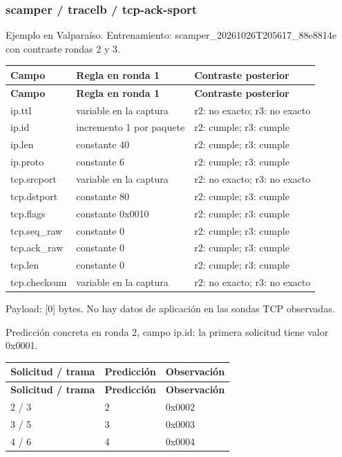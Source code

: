 \subsubsection{scamper / tracelb / tcp-ack-sport}
Ejemplo en Valparaíso. Entrenamiento: scamper\_\allowbreak{}20261026T205617\_\allowbreak{}88e8814e con contraste rondas 2 y 3.

\begingroup
\fontsize{9}{11}\selectfont
\addtocounter{table}{-1}
\begin{longtable}{p{3.1cm}p{5.8cm}p{5.1cm}}
\toprule
\textbf{Campo} & \textbf{Regla en ronda 1} & \textbf{Contraste posterior} \\ \midrule
\endfirsthead
\toprule
\textbf{Campo} & \textbf{Regla en ronda 1} & \textbf{Contraste posterior} \\ \midrule
\endhead
ip.ttl & variable en la captura & r2: no exacto; r3: no exacto \\
ip.id & incremento 1 por paquete & r2: cumple; r3: cumple \\
ip.len & constante 40 & r2: cumple; r3: cumple \\
ip.proto & constante 6 & r2: cumple; r3: cumple \\
tcp.srcport & variable en la captura & r2: no exacto; r3: no exacto \\
tcp.dstport & constante 80 & r2: cumple; r3: cumple \\
tcp.flags & constante 0x0010 & r2: cumple; r3: cumple \\
tcp.seq\_\allowbreak{}raw & constante 0 & r2: cumple; r3: cumple \\
tcp.ack\_\allowbreak{}raw & constante 0 & r2: cumple; r3: cumple \\
tcp.len & constante 0 & r2: cumple; r3: cumple \\
tcp.checksum & variable en la captura & r2: no exacto; r3: no exacto \\
\bottomrule
\end{longtable}
\endgroup
Payload: [0] bytes. No hay datos de aplicación en las sondas TCP observadas.

Predicción concreta en ronda 2, campo ip.id: la primera solicitud tiene valor 0x0001.

\begingroup
\fontsize{9}{11}\selectfont
\addtocounter{table}{-1}
\begin{longtable}{p{3.2cm}p{5.1cm}p{5.1cm}}
\toprule
\textbf{Solicitud / trama} & \textbf{Predicción} & \textbf{Observación} \\ \midrule
\endfirsthead
\toprule
\textbf{Solicitud / trama} & \textbf{Predicción} & \textbf{Observación} \\ \midrule
\endhead
2 / 3 & 2 & 0x0002 \\
3 / 5 & 3 & 0x0003 \\
4 / 6 & 4 & 0x0004 \\
\bottomrule
\end{longtable}
\endgroup

